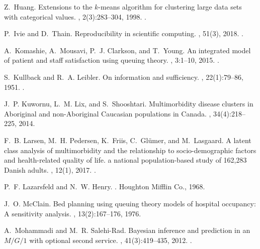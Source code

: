 \documentclass[11pt]{article}
\begin{document}
\begin{thebibliography}{10}
Z.~Huang.
\newblock Extensions to the $k$-means algorithm for clustering large data sets
  with categorical values.
, 2(3):283--304, 1998.
\newblock \href {https://doi.org/10.1023/A:1009769707641}
  {}.

P.~Ivie and D.~Thain.
\newblock Reproducibility in scientific computing.
, 51(3), 2018.
\newblock \href {https://doi.org/10.1145/3186266} {}.

A.~Komashie, A.~Mousavi, P.~J. Clarkson, and T.~Young.
\newblock An integrated model of patient and staff satisfaction using queuing
  theory.
, 3:1--10, 2015.
\newblock \href {https://doi.org/10.1109/JTEHM.2015.2400436}
  {}.

S.~Kullback and R.~A. Leibler.
\newblock On information and sufficiency.
, 22(1):79--86, 1951.
\newblock \href {https://doi.org/10.1214/aoms/1177729694}
  {}.

J.~P. Kuwornu, L.~M. Lix, and S.~Shooshtari.
\newblock Multimorbidity disease clusters in {Aboriginal} and {non-Aboriginal}
  {Caucasian} populations in {Canada}.
, 34(4):218--225, 2014.

F.~B. Larsen, M.~H. Pedersen, K.~Friis, C.~Gl\"{u}mer, and M.~Lasgaard.
\newblock A latent class analysis of multimorbidity and the relationship to
  socio-demographic factors and health-related quality of life. a national
  population-based study of 162,283 {Danish} adults.
, 12(1), 2017.
\newblock \href {https://doi.org/10.1371/journal.pone.0169426}
  {}.

P.~F. Lazarsfeld and N.~W. Henry.
.
\newblock Houghton Mifflin Co., 1968.

J.~O. McClain.
\newblock Bed planning using queuing theory models of hospital occupancy: A
  sensitivity analysis.
, 13(2):167--176, 1976.

A.~Mohammadi and M.~R. Salehi-Rad.
\newblock Bayesian inference and prediction in an {$M/G/1$} with optional
  second service.
,
  41(3):419--435, 2012.
\newblock \href {https://doi.org/10.1080/03610918.2011.588358}
  {}.


\end{thebibliography}
\end{document}
